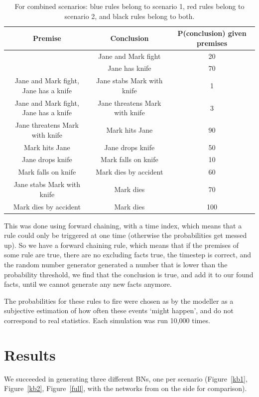 \begin{table}
\begin{tabular}{|c|c|c|}
 \hline
 Premise & Conclusion & P(conclusion) given premises\\
 \hline
  & Jane and Mark fight   & 20   \\
  & Jane has knife & 70 \\
  \color{blue}Jane and Mark fight, Jane has a knife & Jane stabs Mark with knife & 1 \\
 \color{red}Jane and Mark fight, Jane has a knife & Jane threatens Mark with knife & 3 \\
  \color{red}Jane threatens Mark with knife & Mark hits Jane & 90 \\
  \color{red}Mark hits Jane & Jane drops knife & 50  \\
  \color{red}Jane drops knife & Mark falls on knife & 10 \\
  \color{red} Mark falls on knife & Mark dies by accident & 60  \\
  \color{blue}Jane stabs Mark with knife & Mark dies  & 70 \\ 
  \color{red}Mark dies by accident & Mark dies & 100  \\ 
\hline
\end{tabular}
\caption{For combined scenarios: blue rules belong to scenario 1, red rules belong to scenario 2, and black rules belong to both.}
\end{table}

This was done using forward chaining, with a time index, which means that a rule could only be triggered at one time (otherwise the probabilities get messed up). So we have a forward chaining rule, which means that if the premises of some rule are true, there are no excluding facts true, the timestep is correct, and the random number generator generated a number that is lower than the probability threshold, we find that the conclusion is true, and add it to our found facts, until we cannot generate any new facts anymore.

The probabilities for these rules to fire were chosen as by the modeller as a subjective estimation of how often these events `might happen', and do not correspond to real statistics. Each simulation was run 10,000 times.


\section{Results}
We succeeded in generating three different BNs, one per scenario (Figure~\ref{kb1}, Figure~\ref{kb2}, Figure~\ref{full}, with the networks from \citet{Vlek2015} on the side for comparison).

